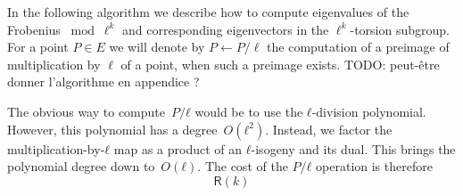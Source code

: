\documentclass{lms}
\newcommand{\todo}[1]{{\color{red}TODO: #1}}
\def\pa#1{\left(#1\right)}
\def\cout#1{\mathsf{#1}}
\begin{document}
In the following algorithm we describe how to compute eigenvalues of
the Frobenius $\bmod \ell^k$ and
corresponding eigenvectors in the $\ell^{k}$-torsion subgroup.
For a point $P \in E$ we will denote by $P \leftarrow P/\ell$ the computation of a preimage of multiplication by $\ell$ of a point, when such a preimage exists.
\todo{peut-être donner l'algorithme en appendice ?}

The obvious way to compute~$P/ℓ$ would be to use the $ℓ$-division polynomial.
However, this polynomial has a degree~$O(ℓ^2)$.
Instead, we factor the multiplication-by-$ℓ$ map
as a product of an $ℓ$-isogeny and its dual.
This brings the polynomial degree down to~$O(ℓ)$.
The cost of the $P/ℓ$ operation is therefore
\begin{equation}\label{eq:div-by-l}
\mathsf{R}(k)
\end{equation}
\end{document}
